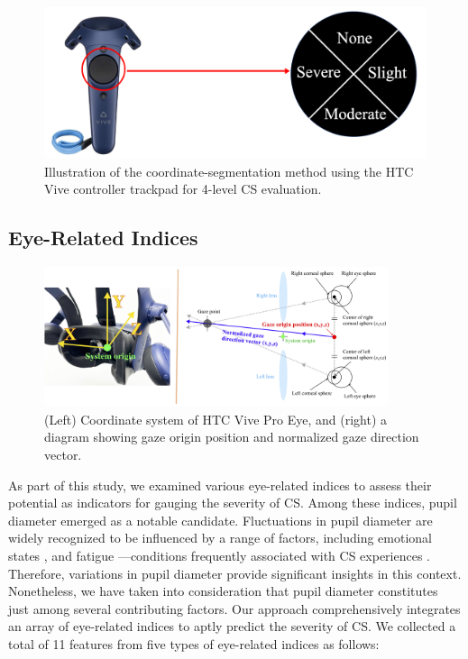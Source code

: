 \documentclass{ieeeaccess}
\begin{document}
 \begin{figure}[th]
  \begin{center}
    \includegraphics*[width=0.7\linewidth]{Evaluation.png}
  \end{center}
  \caption{Illustration of the coordinate-segmentation method using the HTC Vive controller trackpad for 4-level CS evaluation.}
  \label{figure}
\end{figure}

\subsection{Eye-Related Indices}

\begin{figure}[h!]
  \centering
  \includegraphics[width=0.9\textwidth]{Eye_HMD.jpg}
  \caption{(Left) Coordinate system of HTC Vive Pro Eye, and (right) a diagram showing gaze origin position and normalized gaze direction vector.}
  \label{figure}
\end{figure}

As part of this study, we examined various eye-related indices to assess their potential as indicators for gauging the severity of CS. Among these indices, pupil diameter emerged as a notable candidate. Fluctuations in pupil diameter are widely recognized to be influenced by a range of factors, including emotional states \cite{Bradley_2008, Tarnowski_2020}, and fatigue \cite{Wang_2017}—conditions frequently associated with CS experiences \cite{Kaufeld_2022, Kim_2_2021, LaViola_2020}. Therefore, variations in pupil diameter provide significant insights in this context. Nonetheless, we have taken into consideration that pupil diameter constitutes just among several contributing factors. Our approach comprehensively integrates an array of eye-related indices to aptly predict the severity of CS.
We collected a total of 11 features from five types of eye-related indices as follows: 
\end{document}
